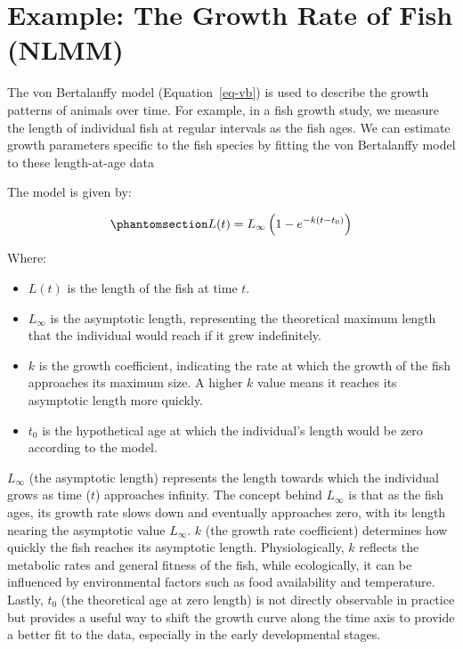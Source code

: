 \documentclass[
  letterpaper,
]{book}
\providecommand{\tightlist}{%
  \setlength{\itemsep}{0pt}\setlength{\parskip}{0pt}}\usepackage{longtable,booktabs,array}
\begin{document}
\section{Example: The Growth Rate of Fish
(NLMM)}\label{sec-vonbertalanffy}

The von Bertalanffy model (Equation~\ref{eq-vb}) is used to describe the
growth patterns of animals over time. For example, in a fish growth
study, we measure the length of individual fish at regular intervals as
the fish ages. We can estimate growth parameters specific to the fish
species by fitting the von Bertalanffy model to these length-at-age data

The model is given by:

\begin{equation}\phantomsection\label{eq-vb}{L(t) = L_{\infty} \left(1 - e^{-k(t-t_0)}\right)}\end{equation}

Where:

\begin{itemize}
\tightlist
\item
  \(L(t)\) is the length of the fish at time \(t\).
\item
  \(L_{\infty}\) is the asymptotic length, representing the theoretical
  maximum length that the individual would reach if it grew
  indefinitely.
\item
  \(k\) is the growth coefficient, indicating the rate at which the
  growth of the fish approaches its maximum size. A higher \(k\) value
  means it reaches its asymptotic length more quickly.
\item
  \(t_0\) is the hypothetical age at which the individual's length would
  be zero according to the model.
\end{itemize}

\(L_{\infty}\) (the asymptotic length) represents the length towards
which the individual grows as time (\(t\)) approaches infinity. The
concept behind \(L_{\infty}\) is that as the fish ages, its growth rate
slows down and eventually approaches zero, with its length nearing the
asymptotic value \(L_{\infty}\). \(k\) (the growth rate coefficient)
determines how quickly the fish reaches its asymptotic length.
Physiologically, \(k\) reflects the metabolic rates and general fitness
of the fish, while ecologically, it can be influenced by environmental
factors such as food availability and temperature. Lastly, \(t_0\) (the
theoretical age at zero length) is not directly observable in practice
but provides a useful way to shift the growth curve along the time axis
to provide a better fit to the data, especially in the early
developmental stages.
\end{document}
